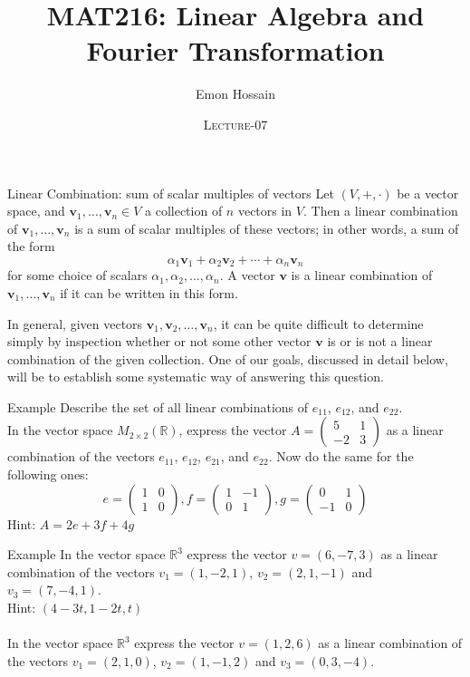 \documentclass[11pt]{beamer}
\author[] %
{Emon Hossain\inst{1}}
\institute[University of Dhaka] %
{
  \inst{1}%
  Lecturer\\MNS department\\Brac University
}
\date[] %
{\textsc{Lecture-07}}
\title[]{MAT216: Linear Algebra and Fourier Transformation}
\theoremstyle{plain}
\begin{document}
\begin{frame}
\titlepage
\end{frame}


\begin{frame}{Linear Combination: sum of scalar multiples of vectors}
    Let $(V,+, \cdot)$ be a vector space, and $\mathbf{v}_1, \ldots, \mathbf{v}_n \in V$ a collection of $n$ vectors in $V$. Then a linear combination of $\mathbf{v}_1, \ldots, \mathbf{v}_n$ is a sum of scalar multiples of these vectors; in other words, a sum of the form
$$
\alpha_1 \mathbf{v}_1+\alpha_2 \mathbf{v}_2+\cdots+\alpha_n \mathbf{v}_n
$$
for some choice of scalars $\alpha_1, \alpha_2, \ldots, \alpha_n$. A vector $\mathbf{v}$ is a linear combination of $\mathbf{v}_1, \ldots, \mathbf{v}_n$ if it can be written in this form.

In general, given vectors $\mathbf{v}_1, \mathbf{v}_2, \ldots, \mathbf{v}_n$, it can be quite difficult to determine simply by inspection whether or not some other vector $\mathbf{v}$ is or is not a linear combination of the given collection. One of our goals, discussed in detail below, will be to establish some systematic way of answering this question.
\end{frame}

\begin{frame}{Example}
    Describe the set of all linear combinations of $e_{11}$, $e_{12}$, and $e_{22}$.\\
    In the vector space $M_{2\times2}(\mathbb R)$, express the vector $A=\begin{pmatrix}
        5&1\\-2&3
    \end{pmatrix}$ as a linear combination of the vectors $e_{11}$, $e_{12}$, $e_{21}$, and $e_{22}$. Now do the same for the following ones:
    $$
    e=\begin{pmatrix}
        1&0\\1&0
    \end{pmatrix}, f=\begin{pmatrix}
        1&-1\\0&1
    \end{pmatrix},g=\begin{pmatrix}
        0&1\\-1&0
    \end{pmatrix}
    $$
    Hint: $A=2e+3f+4g$
\end{frame}

\begin{frame}{Example}
    In the vector space $\mathbb R^3$ express the vector $v=(6,-7,3)$ as a linear combination of the vectors $v_1=(1,-2,1)$, $v_2=(2,1,-1)$ and $v_3=(7,-4,1)$.\\ 
    Hint: $(4-3t,1-2t,t)$\\~\\
    In the vector space $\mathbb R^3$ express the vector $v=(1,2,6)$ as a linear combination of the vectors $v_1=(2,1,0)$, $v_2=(1,-1,2)$ and $v_3=(0,3,-4)$.
\end{frame}
\end{document}

